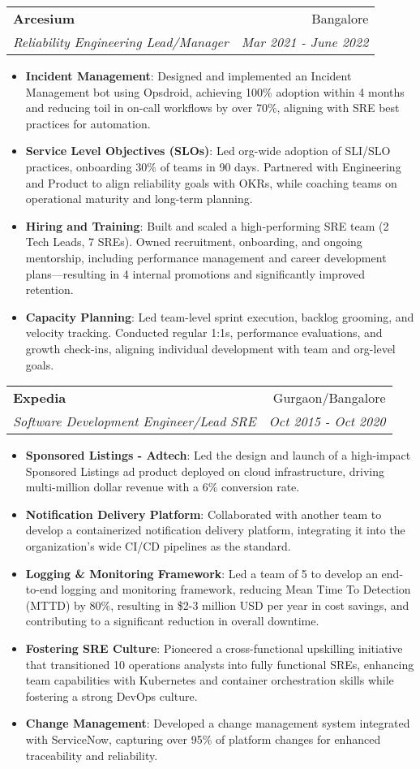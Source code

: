 \documentclass[letterpaper,11pt]{article}
\makeatletter
\newcommand{\resumeItem}[2]{
  \item\small{
    \textbf{#1}{: #2 \vspace{-2pt}}
  }
}
\newcommand{\resumeSubheading}[4]{
  \vspace{-1pt}\item
    \begin{tabular*}{0.97\textwidth}{l@{\extracolsep{\fill}}r}
      \textbf{#1} & #2 \\
      \textit{\small#3} & \textit{\small #4} \\
    \end{tabular*}\vspace{-5pt}
}
\newcommand{\resumeItemListStart}{\begin{itemize}}
\newcommand{\resumeItemListEnd}{\end{itemize}\vspace{-5pt}}
\makeatother
\begin{document}
    \resumeSubheading
      {Arcesium}{Bangalore}
      {Reliability Engineering Lead/Manager}{Mar 2021 - June 2022}
      \resumeItemListStart
        \resumeItem{Incident Management}
          {Designed and implemented an Incident Management bot using Opsdroid, achieving 100\% adoption within 4 months and reducing toil in on-call workflows by over 70\%, aligning with SRE best practices for automation.}
        \resumeItem{Service Level Objectives (SLOs)}
          {Led org-wide adoption of SLI/SLO practices, onboarding 30\% of teams in 90 days. Partnered with Engineering and Product to align reliability goals with OKRs, while coaching teams on operational maturity and long-term planning.}
        \resumeItem{Hiring and Training}
          {Built and scaled a high-performing SRE team (2 Tech Leads, 7 SREs). Owned recruitment, onboarding, and ongoing mentorship, including performance management and career development plans—resulting in 4 internal promotions and significantly improved retention.}
        \resumeItem{Capacity Planning}
          {Led team-level sprint execution, backlog grooming, and velocity tracking. Conducted regular 1:1s, performance evaluations, and growth check-ins, aligning individual development with team and org-level goals.}
      \resumeItemListEnd

    \resumeSubheading
      {Expedia}{Gurgaon/Bangalore}
      {Software Development Engineer/Lead SRE}{Oct 2015 - Oct 2020}
      \resumeItemListStart
        \resumeItem{Sponsored Listings - Adtech}
          {Led the design and launch of a high-impact Sponsored Listings ad product deployed on cloud infrastructure, driving multi-million dollar revenue with a 6\% conversion rate.}
        \resumeItem{Notification Delivery Platform}
          {Collaborated with another team to develop a containerized notification delivery platform, integrating it into the organization's wide CI/CD pipelines as the standard.}
        \resumeItem{Logging \& Monitoring Framework}
          {Led a team of 5 to develop an end-to-end logging and monitoring framework, reducing Mean Time To Detection (MTTD) by 80\%, resulting in \$2-3 million USD per year in cost savings, and contributing to a significant reduction in overall downtime.}
        \resumeItem{Fostering SRE Culture}
          {Pioneered a cross-functional upskilling initiative that transitioned 10 operations analysts into fully functional SREs, enhancing team capabilities with Kubernetes and container orchestration skills while fostering a strong DevOps culture.}
        \resumeItem{Change Management}
          {Developed a change management system integrated with ServiceNow, capturing over 95\% of platform changes for enhanced traceability and reliability.}
      \resumeItemListEnd
\end{document}
